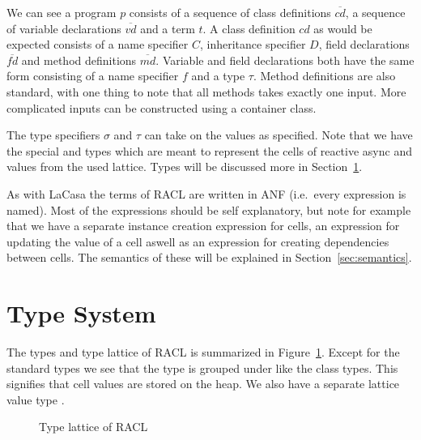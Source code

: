 We can see a program $p$ consists of a sequence of class definitions
$\overline{cd}$, a sequence of variable declarations $\overline{vd}$ and a term
$t$. A class definition $cd$ as would be expected consists of a name specifier
$C$, inheritance specifier $D$, field declarations $\overline{fd}$ and method
definitions $\overline{md}$. Variable and field declarations both have the same
form consisting of a name specifier $f$ and a type $\tau$. Method definitions
are also standard, with one thing to note that all methods takes exactly one
input. More complicated inputs can be constructed using a container class.

The type specifiers $\sigma$ and $\tau$ can take on the values as specified.
Note that we have the special \CellType{} and \LatType{} types which are meant
to represent the cells of reactive async and values from the used lattice. Types
will be discussed more in Section~\ref{sec:type_system}.

As with LaCasa the terms of RACL are written in ANF (i.e.\ every expression is
named). Most of the expressions should be self explanatory, but note for example
that we have a separate instance creation expression for cells, an expression
for updating the value of a cell aswell as an expression for creating
dependencies between cells. The semantics of these will be explained in
Section~\ref{sec:semantics}.


\section{Type System}
\label{sec:type_system}

The types and type lattice of RACL is summarized in
Figure~\ref{fig:racl_typelat}. Except for the standard types we see that the
\CellType{} type is grouped under \AnyRefType{} like the class types. This
signifies that cell values are stored on the heap. We also have a separate
lattice value type \LatType{}.

\begin{figure}[]
  \centering
  \caption{Type lattice of RACL}
  \label{fig:racl_typelat}
\end{figure}

